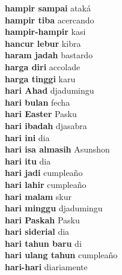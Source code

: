 \textbf{ hampir sampai  } ataká \\
\textbf{ hampir tiba  } acercando \\
\textbf{ hampir-hampir  } kasi \\
\textbf{ hancur lebur  } kibra \\
\textbf{ haram jadah  } bastardo \\
\textbf{ harga diri  } accolade \\
\textbf{ harga tinggi  } karu \\
\textbf{ hari Ahad  } djadumingu \\
\textbf{ hari bulan  } fecha \\
\textbf{ hari Easter  } Pasku \\
\textbf{ hari ibadah  } djasabra \\
\textbf{ hari ini  } dia \\
\textbf{ hari isa almasih  } Asunshon \\
\textbf{ hari itu  } dia \\
\textbf{ hari jadi  } cumpleaño \\
\textbf{ hari lahir  } cumpleaño \\
\textbf{ hari malam  } skur \\
\textbf{ hari minggu  } djadumingu \\
\textbf{ hari Paskah  } Pasku \\
\textbf{ hari siderial  } dia \\
\textbf{ hari tahun baru  } di \\
\textbf{ hari ulang tahun  } cumpleaño \\
\textbf{ hari-hari  } diariamente \\
